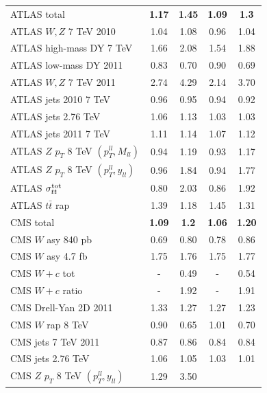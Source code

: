 \begin{table}[h]
\begin{center}
\begin{tabular}{|l|c|c||c|c|}
\hline
\hline
ATLAS total      &   {\bf 1.17}     &  {\bf 1.45}  &
{\bf 1.09}      &   {\bf 1.3}  \\    
  ATLAS $W,Z$ 7 TeV 2010      &   1.04      &   1.08 &   0.96     &   1.04  \\
  ATLAS high-mass DY 7 TeV      &   1.66     &   2.08
   &    1.54     &   1.88  \\
  ATLAS low-mass DY 2011      &   0.83      &   0.70
  &    0.90      &   0.69 \\
  ATLAS $W,Z$ 7 TeV 2011       &   2.74      &   4.29
   &    2.14     &   3.70  \\
ATLAS jets 2010 7 TeV       &   0.96      &   0.95  &    0.94      &   0.92  \\
ATLAS jets 2.76 TeV       &   1.06      &   1.13   &    1.03      &   1.03  \\
ATLAS jets 2011 7 TeV       &   1.11     &   1.14   &    1.07     &   1.12  \\
ATLAS $Z$ $p_T$ 8 TeV $(p_T^{ll},M_{ll})$          &   0.94     &   1.19
&    0.93    &   1.17 \\
ATLAS $Z$ $p_T$ 8 TeV $(p_T^{ll},y_{ll})$      &   0.96      &   1.84
 &    0.94      &   1.77 \\
ATLAS $\sigma_{tt}^{\rm tot}$       &   0.80      &   2.03  &    0.86      &   1.92  \\
ATLAS $t\bar{t}$ rap      &   1.39     &   1.18  &    1.45     &   1.31  \\
\hline
CMS total     &   {\bf 1.09}     &   {\bf 1.2}
&    {\bf  1.06}    &   {\bf 1.20 } \\
CMS $W$ asy 840 pb       &   0.69     &   0.80  &    0.78     &   0.86  \\
CMS $W$ asy 4.7 fb        &   1.75      &   1.76
 &    1.75     &   1.77\\
CMS $W+c$ tot      &   -     &   0.49  &    -     &   0.54 \\
CMS $W+c$ ratio       &   -     &   1.92   &    -      &   1.91 \\
CMS Drell-Yan 2D 2011       &   1.33      &   1.27
 &    1.27     &   1.23  \\
CMS $W$ rap 8 TeV       &   0.90      &   0.65 &    1.01      &   0.70    \\
CMS jets 7 TeV 2011       &   0.87      &   0.86
&    0.84      &   0.84  \\
CMS jets 2.76 TeV       &   1.06      &   1.05  &    1.03      &   1.01  \\
CMS $Z$ $p_T$ 8 TeV $(p_T^{ll},y_{ll})$      &   1.29      &   3.50

\end{tabular}
\end{center}
\end{table}

